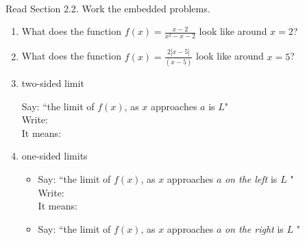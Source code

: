 \documentclass[11pt,fleqn]{article}
\begin{document}
\renewcommand{\headrulewidth}{0pt}
\newcommand{\blank}[1]{\rule{#1}{0.75pt}}
\newcommand{\bc}{\begin{center}}
\newcommand{\ec}{\end{center}}
\renewcommand{\d}{\displaystyle}

\vspace*{-0.7in}

\begin{center}
  \LARGE
  \\
\end{center}
Read Section 2.2. Work the embedded problems. \\
\hrulefill

\begin{enumerate}

\item {} What does the function $f(x) = \frac{x-2}{x^2-x-2}$ look like around $x=2$?

\vfill

\item {} What does the function $f(x) = \frac{2|x-5|}{(x-5)}$ look like around $x=5$?
\vfill
\newpage
\item {} two-sided limit

Say: ``the limit of $f(x)$, as $x$ approaches $a$ is $L$"\\

Write: \\

It means: \\
\vspace{0.5in}

\item {} one-sided limits
	\begin{itemize}

	\item Say: ``the limit of $f(x)$, as $x$ approaches $a$ \emph{on the left} is $L$ "\\

Write: \\

It means: \\
\vspace{0.5in}

	\item Say: ``the limit of $f(x)$, as $x$ approaches $a$ \emph{on the right} is $L$ "\\


\end{itemize}
\end{enumerate}
\end{document}
